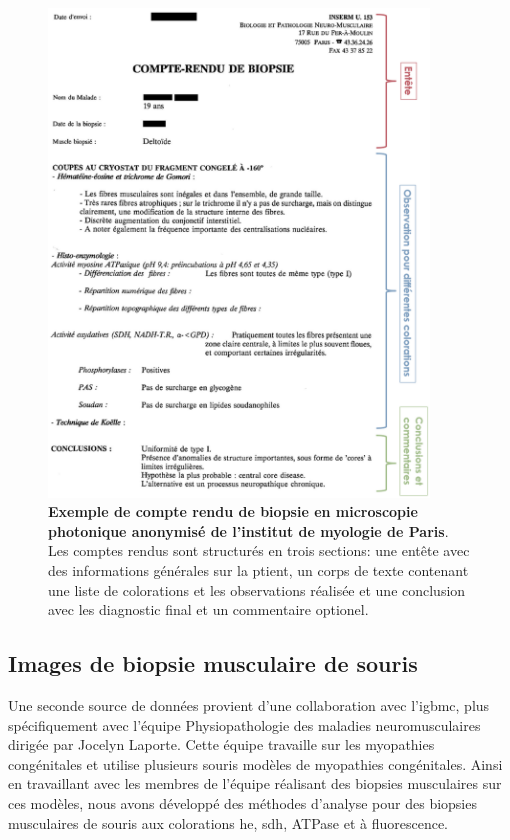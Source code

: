 \begin{figure}[!ht]
 \centering
 \includegraphics[width=0.9\textwidth]{figures/compte_rendu_exemple.png}
 \caption[Exemple de compte rendu de biopsie]{\textbf{Exemple de compte rendu de biopsie en microscopie photonique anonymisé de l'institut de myologie de Paris}. Les comptes rendus sont structurés en trois sections: une entête avec des informations générales sur la ptient, un corps de texte contenant une liste de colorations et les observations réalisée et une conclusion avec les diagnostic final et un commentaire optionel.}
 \label{fig:compte-rendu-exemple}
\end{figure}

\subsection{Images de biopsie musculaire de souris}
Une seconde source de données provient d'une collaboration avec l'\gls{igbmc}, plus spécifiquement avec l'équipe Physiopathologie des maladies neuromusculaires dirigée par Jocelyn Laporte. Cette équipe travaille sur les myopathies congénitales et utilise plusieurs souris modèles de myopathies congénitales. Ainsi en travaillant avec les membres de l'équipe réalisant des biopsies musculaires sur ces modèles, nous avons développé des méthodes d'analyse pour des biopsies musculaires de souris aux colorations \gls{he}, \gls{sdh}, ATPase et à fluorescence.


